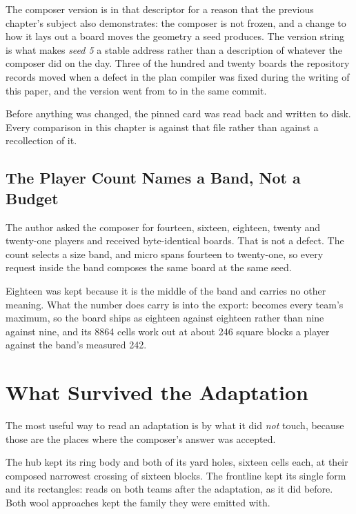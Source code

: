The composer version is in that descriptor for a reason that the previous
chapter's subject also demonstrates: the composer is not frozen, and a change
to how it lays out a board moves the geometry a seed produces. The version
string is what makes \emph{seed 5} a stable address rather than a description
of whatever the composer did on the day. Three of the hundred and twenty boards
the repository records moved when a defect in the plan compiler was fixed
during the writing of this paper, and the version went from 
to  in the same commit.

Before anything was changed, the pinned card was read back and written to disk.
Every comparison in this chapter is against that file rather than against a
recollection of it.

\subsection{The Player Count Names a Band, Not a Budget}

The author asked the composer for fourteen, sixteen, eighteen, twenty and
twenty-one players and received byte-identical boards. That is not a defect. The
count selects a size band, and micro spans fourteen to twenty-one, so every
request inside the band composes the same board at the same seed.

Eighteen was kept because it is the middle of the band and carries no other
meaning. What the number does carry is into the export:  becomes
every team's maximum, so the board ships as eighteen against eighteen rather
than nine against nine, and its 8864 cells work out at about 246 square blocks
a player against the band's measured 242.

\section{What Survived the Adaptation}

The most useful way to read an adaptation is by what it did \emph{not} touch,
because those are the places where the composer's answer was accepted.

The hub kept its ring body and both of its yard holes, sixteen cells each, at
their composed narrowest crossing of sixteen blocks. The frontline kept its
single form and its rectangles:  reads
 on both teams after the adaptation, as it
did before. Both wool approaches kept the  family they were emitted with.

